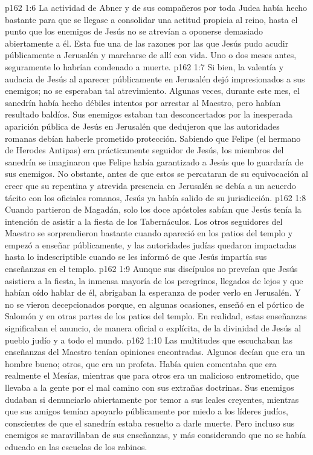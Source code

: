 \vs p162 1:6 La actividad de Abner y de sus compañeros por toda Judea había hecho bastante para que se llegase a consolidar una actitud propicia al reino, hasta el punto que los enemigos de Jesús no se atrevían a oponerse demasiado abiertamente a él. Esta fue una de las razones por las que Jesús pudo acudir públicamente a Jerusalén y marcharse de allí con vida. Uno o dos meses antes, seguramente lo habrían condenado a muerte.
\vs p162 1:7 Si bien, la valentía y audacia de Jesús al aparecer públicamente en Jerusalén dejó impresionados a sus enemigos; no se esperaban tal atrevimiento. Algunas veces, durante este mes, el sanedrín había hecho débiles intentos por arrestar al Maestro, pero habían resultado baldíos. Sus enemigos estaban tan desconcertados por la inesperada aparición pública de Jesús en Jerusalén que dedujeron que las autoridades romanas debían haberle prometido protección. Sabiendo que Felipe (el hermano de Herodes Antipas) era prácticamente seguidor de Jesús, los miembros del sanedrín se imaginaron que Felipe había garantizado a Jesús que lo guardaría de sus enemigos. No obstante, antes de que estos se percataran de su equivocación al creer que su repentina y atrevida presencia en Jerusalén se debía a un acuerdo tácito con los oficiales romanos, Jesús ya había salido de su jurisdicción.
\vs p162 1:8 Cuando partieron de Magadán, solo los doce apóstoles sabían que Jesús tenía la intención de asistir a la fiesta de los Tabernáculos. Los otros seguidores del Maestro se sorprendieron bastante cuando apareció en los patios del templo y empezó a enseñar públicamente, y las autoridades judías quedaron impactadas hasta lo indescriptible cuando se les informó de que Jesús impartía sus enseñanzas en el templo.
\vs p162 1:9 Aunque sus discípulos no preveían que Jesús asistiera a la fiesta, la inmensa mayoría de los peregrinos, llegados de lejos y que habían oído hablar de él, abrigaban la esperanza de poder verlo en Jerusalén. Y no se vieron decepcionados porque, en algunas ocasiones, enseñó en el pórtico de Salomón y en otras partes de los patios del templo. En realidad, estas enseñanzas significaban el anuncio, de manera oficial o explícita, de la divinidad de Jesús al pueblo judío y a todo el mundo.
\vs p162 1:10 Las multitudes que escuchaban las enseñanzas del Maestro tenían opiniones encontradas. Algunos decían que era un hombre bueno; otros, que era un profeta. Había quien comentaba que era realmente el Mesías, mientras que para otros era un malicioso entrometido, que llevaba a la gente por el mal camino con sus extrañas doctrinas. Sus enemigos dudaban si denunciarlo abiertamente por temor a sus leales creyentes, mientras que sus amigos temían apoyarlo públicamente por miedo a los líderes judíos, conscientes de que el sanedrín estaba resuelto a darle muerte. Pero incluso sus enemigos se maravillaban de sus enseñanzas, y más considerando que no se había educado en las escuelas de los rabinos.
